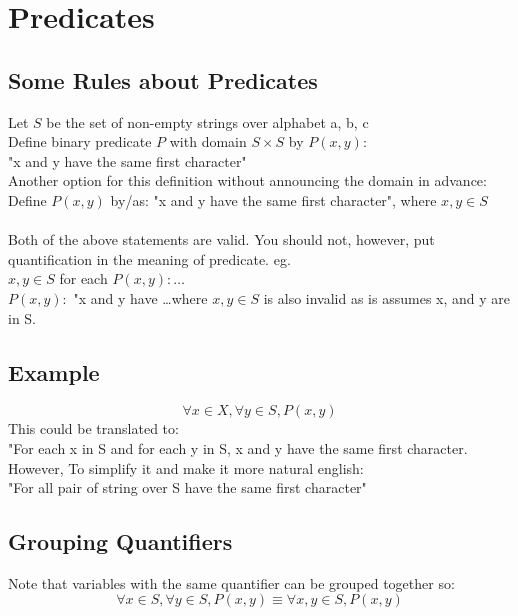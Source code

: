 \documentclass[12pt, letterpaper, twoside]{article}
\begin{document}

\section{Predicates}

\subsection{Some Rules about Predicates}
Let $S$ be the set of non-empty strings over alphabet {a, b, c} \\
\hspace*{10mm} Define binary predicate $P$ with domain $S \times S$ by $P(x, y)$: \\
\hspace*{10mm}"x and y have the same first character"\\
Another option for this definition without announcing the domain in advance:\\
\hspace*{10mm} Define $P(x, y)$ by/as: "x and y have the same first character", where $x, y \in S$
\\
\\
Both of the above statements are valid. You should not, however, put quantification in the meaning of predicate. eg.
\\
\hspace*{10mm}$x, y \in S$ for each  $P(x, y): \dots$
\\
$P(x, y):$ "x and y have \dots where $x, y \in S$ is also invalid as is assumes x, and y are in S.

\subsection{Example}
$$
\forall x \in X, \forall y \in S, P(x, y)
$$
This could be translated to:\\
\hspace*{10mm} "For each x in S and for each y in S, x and y have the same first character.\\
However, To simplify it and make it more natural english:\\
\hspace*{10mm} "For all pair of string over S have the same first character"
\\
\subsection{Grouping Quantifiers}
Note that variables with the same quantifier can be grouped together so:
$$
\forall x \in S, \forall y \in S, P(x, y) \equiv \forall x, y \in S, P(x, y)
$$
\\
\end{document}
